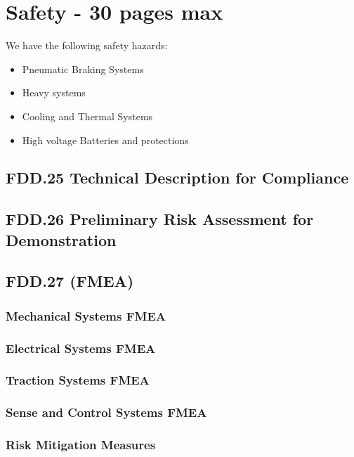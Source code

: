 \chapter{Safety - 30 pages max}



We have the following safety hazards:
\begin{itemize}
    \item Pneumatic Braking Systems
    \item Heavy systems
    \item Cooling and Thermal Systems 
    \item High voltage Batteries and protections
\end{itemize}
\section{FDD.25 Technical Description for Compliance}

\section{FDD.26 Preliminary Risk Assessment for Demonstration}

\section{FDD.27 (FMEA)}
\subsection{Mechanical Systems FMEA}
\subsection{Electrical Systems FMEA}
\subsection{Traction Systems FMEA}
\subsection{Sense and Control Systems FMEA}
\subsection{Risk Mitigation Measures}

